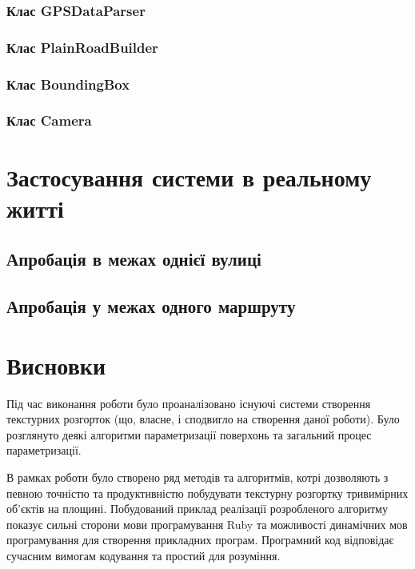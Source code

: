 \documentclass[simple,a4paper,14pt,ukrainian,utf8]{eskdtext}
\begin{document}
        \subsubsection{Клас GPSDataParser}

        \subsubsection{Клас PlainRoadBuilder}
        
        \subsubsection{Клас BoundingBox}

        \subsubsection{Клас Camera}
        
    \newpage \section{Застосування системи в реальному житті}

	\subsection{Апробація в межах однієї вулиці}
	
	\subsection{Апробація у межах одного маршруту}

  \newpage
  \section*{Висновки}

    Під час виконання роботи було проаналізовано існуючі системи створення текстурних розгорток (що, власне, і сподвигло на створення даної роботи). Було розглянуто деякі алгоритми параметризації поверхонь та загальний процес параметризації.

    В рамках роботи було створено ряд методів та алгоритмів, котрі дозволяють з певною точністю та продуктивністю побудувати текстурну розгортку тривимірних об’єктів на площині. Побудований приклад реалізації розробленого алгоритму показує сильні сторони мови програмування Ruby та можливості  динамічних мов програмування для створення прикладних програм. Програмний код відповідає сучасним вимогам кодування та простий для розуміння.
\end{document}
